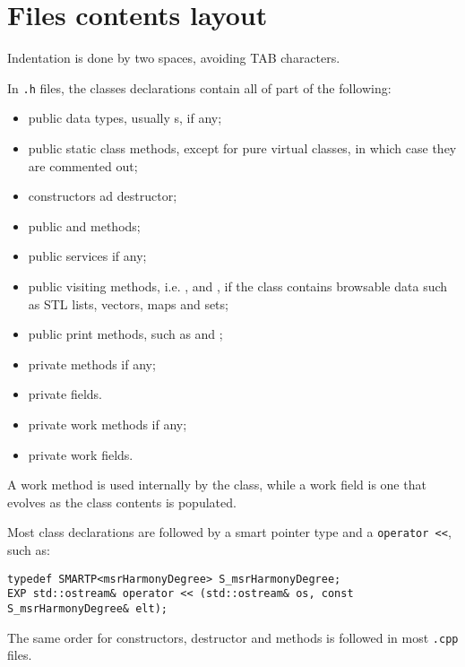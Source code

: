 \section{Files contents layout}

Indentation is done by two spaces, avoiding TAB characters.

In {\tt *.h} files, the classes declarations contain all of part of the following:
\begin{itemize}
\item public data types, usually \enumType s, if any;
\item public static class    methods, except for pure virtual classes, in which case they are commented out;
\item constructors ad destructor;
\item public  and  methods;
\item public services if any;
\item public visiting methods, i.e. ,  and , if the class   contains browsable data such as STL lists, vectors, maps and sets;
\item public print methods, such as  and ;
\item private methods if any;
\item private fields.
\item private work methods if any;%
\item private work fields.
\end{itemize}

A work method is used internally by the class, while a work field is one that evolves as the class   contents is populated.

Most class   declarations are followed by a smart pointer type and a {\tt operator <<}, such as:
\begin{lstlisting}[language=CPlusPlus]
typedef SMARTP<msrHarmonyDegree> S_msrHarmonyDegree;
EXP std::ostream& operator << (std::ostream& os, const S_msrHarmonyDegree& elt);
\end{lstlisting}

The same order for constructors, destructor and methods is followed in most {\tt .cpp} files.


